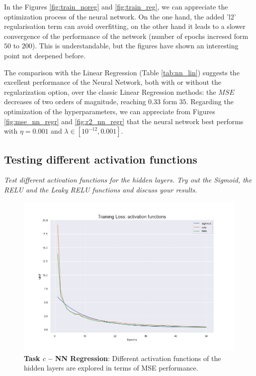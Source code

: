 \documentclass[english,notitlepage,reprint,nofootinbib]{revtex4-1}  %
\begin{document}
In the Figures \ref{fig:train_noreg} and \ref{fig:train_reg}, we can appreciate the optimization process of the neural network. On the one hand, the added 'l2' regularisation term can avoid overfitting, on the other hand it leads to a slower convergence of the performance of the network (number of epochs incresed form $50$ to $200$). This is understandable, but the figures have shown an interesting point not deepened before.

The comparison with the Linear Regression (Table \ref{tab:nn_lin}) suggests the excellent performance of the Neural Network, both with or without the regularization option, over the classic Linear Regression methods: the $MSE$ decreases of two orders of magnitude, reaching $0.33$ form $35$. Regarding the optimization of the hyperparameters, we can appreciate from Figures \ref{fig:mse_nn_regr} and \ref{fig:r2_nn_regr} that the neural network best performs with $\eta=0.001$ and $\lambda \in [10^{-12},0.001]$.


\subsection{Testing different activation functions}

\textit{Test different activation functions for the hidden layers. Try out the Sigmoid, the RELU and the Leaky RELU functions and discuss your results. }

\begin{figure}[h]
    \centering 
    \includegraphics[scale=0.3]{NN/RegrNN_activations.jpg}
    \caption{\textbf{Task $c$ – NN Regression}: Different activation functions of the hidden layers are explored in terms of MSE performance.}
    \label{fig:activations}
\end{figure}
\end{document}

